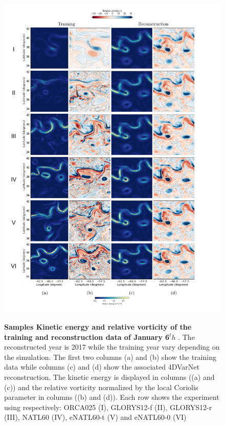 \begin{bibunit}
\begin{figure}[H]
\small

\begin{center}

\includegraphics[width=\linewidth]{./00_Simulearning/standalone_figures/maps.pdf}

\caption{\textbf{Samples 
Kinetic energy and relative vorticity of the training and reconstruction data of January 6$^th$ }.
The reconstructed year is 2017 while the training year vary depending on the simulation.
The first two columns (a) and (b) show the training data while columns (c) and (d) show the associated 4DVarNet reconstruction.
The kinetic energy is displayed in columns ((a) and (c)) and the relative vorticity normalized by the local Coriolis parameter in columns ((b) and (d)).
Each row shows the experiment using respectively: ORCA025 (I), GLORYS12-f (II), GLORYS12-r (III), NATL60 (IV), eNATL60-t (V) and eNATL60-0 (VI)}
\vspace{-5mm}
\label{fig:maps}
\end{center}
\end{figure}




\end{bibunit}
